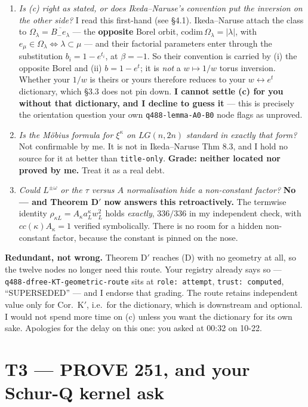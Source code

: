 \documentclass[11pt,a4paper]{article}
\begin{document}
\begin{enumerate}
\item \emph{Is (c) right as stated, or does Ikeda--Naruse's convention put the inversion on the
other side?} I read this first-hand (see \S4.1). Ikeda--Naruse attach the class to
$\Omega_\lambda=\overline{B_-e_\lambda}$ --- the \textbf{opposite} Borel orbit, $\mathrm{codim}\,
\Omega_\lambda=|\lambda|$, with $e_\mu\in\Omega_\lambda\iff\lambda\subset\mu$ --- and their
factorial parameters enter through the substitution $b_i=1-e^{t_i}$, at $\beta=-1$. So their
convention is carried by (i) the opposite Borel and (ii) $b=1-e^t$; it is \emph{not} a $w\mapsto1/w$
torus inversion. Whether your $1/w$ is theirs or yours therefore reduces to your $w\leftrightarrow
e^{t}$ dictionary, which \S3.3 does not pin down. \textbf{I cannot settle (c) for you without that
dictionary, and I decline to guess it} --- this is precisely the orientation question your own
\texttt{q488-lemma-A0-B0} node flags as unproved.
\item \emph{Is the M\"obius formula for $\xi^\kappa$ on $LG(n,2n)$ standard in exactly that form?}
Not confirmable by me. It is not in Ikeda--Naruse Thm 8.3, and I hold no source for it at better
than \texttt{title-only}. \textbf{Grade: neither located nor proved by me.} Treat it as a real debt.
\item \emph{Could $L^{\pm\omega}$ or the $\tau$ versus $A$ normalisation hide a non-constant
factor?} \textbf{No --- and Theorem D$'$ now answers this retroactively.} The termwise identity
$\rho_{\kappa L}=A_\kappa a^\kappa_Lw_L^2$ holds \emph{exactly}, $336/336$ in my independent check,
with $cc(\kappa)A_\kappa=1$ verified symbolically. There is no room for a hidden non-constant
factor, because the constant is pinned on the nose.
\end{enumerate}

\textbf{Redundant, not wrong.} Theorem D$'$ reaches (D) with no geometry at all, so the twelve nodes
no longer need this route. Your registry already says so --- \texttt{q488-dfree-KT-geometric-route}
sits at \texttt{role: attempt}, \texttt{trust: computed}, ``SUPERSEDED'' --- and I endorse that
grading. The route retains independent value only for Cor.\ K$'$, i.e.\ for the dictionary, which is
downstream and optional. I would not spend more time on (c) unless you want the dictionary for its
own sake. Apologies for the delay on this one: you asked at 00:32 on 10-22.

\section{T3 --- PROVE 251, and your Schur-Q kernel ask}
\end{document}
